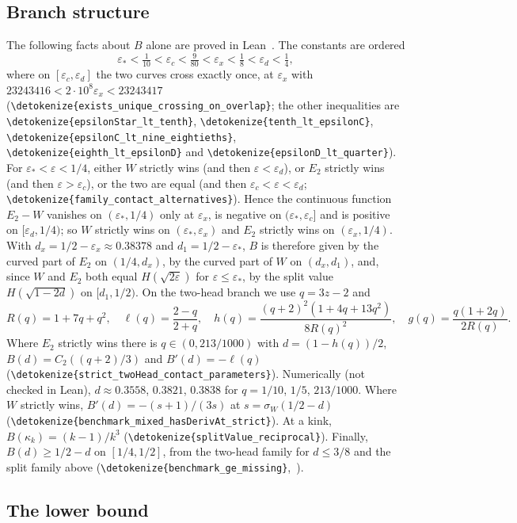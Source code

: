 \documentclass[10pt]{article}
\theoremstyle{definition}
\theoremstyle{remark}
\numberwithin{equation}{section}
\newcommand{\eps}{\varepsilon}
\newcommand{\leanid}[1]{\expandafter\nolinkurl\expandafter{\detokenize{#1}}}
\newcommand{\Fm}[1]{\cite[#1]{Formalization}}
\begin{document}
\subsection{Branch structure}\label{sec:branches}
The following facts about $B$ alone are proved in Lean~\Fm{\S2}. The constants are ordered
\[
 \eps_*<\tfrac1{10}<\eps_c<\tfrac9{80}<\eps_x<\tfrac18<\eps_d<\tfrac14,
\]
where on $[\eps_c,\eps_d]$ the two curves cross exactly once, at $\eps_x$ with $23243416<2\cdot10^8\eps_x<23243417$ (\leanid{exists_unique_crossing_on_overlap}; the other inequalities are \leanid{epsilonStar_lt_tenth}, \leanid{tenth_lt_epsilonC}, \leanid{epsilonC_lt_nine_eightieths}, \leanid{eighth_lt_epsilonD} and \leanid{epsilonD_lt_quarter}). For $\eps_*<\eps<1/4$, either $W$ strictly wins (and then $\eps<\eps_d$), or $E_2$ strictly wins (and then $\eps>\eps_c$), or the two are equal (and then $\eps_c<\eps<\eps_d$; \leanid{family_contact_alternatives}). Hence the continuous function $E_2-W$ vanishes on $(\eps_*,1/4)$ only at $\eps_x$, is negative on $(\eps_*,\eps_c]$ and is positive on $[\eps_d,1/4)$; so $W$ strictly wins on $(\eps_*,\eps_x)$ and $E_2$ strictly wins on $(\eps_x,1/4)$. With $d_x=1/2-\eps_x\approx0.38378$ and $d_1=1/2-\eps_*$, $B$ is therefore given by the curved part of $E_2$ on $(1/4,d_x)$, by the curved part of $W$ on $(d_x,d_1)$, and, since $W$ and $E_2$ both equal $H(\sqrt{2\eps})$ for $\eps\le\eps_*$, by the split value $H(\sqrt{1-2d})$ on $[d_1,1/2)$. On the two-head branch we use $q=3z-2$ and
\begin{equation}\label{eq:qparam}
 R(q)=1+7q+q^2,\quad \ell(q)=\frac{2-q}{2+q},\quad h(q)=\frac{(q+2)^2(1+4q+13q^2)}{8R(q)^2},\quad g(q)=\frac{q(1+2q)}{2R(q)} .
\end{equation}
Where $E_2$ strictly wins there is $q\in(0,213/1000)$ with $d=(1-h(q))/2$, $B(d)=C_2((q+2)/3)$ and $B'(d)=-\ell(q)$ (\leanid{strict_twoHead_contact_parameters}). Numerically (not checked in Lean), $d\approx0.3558$, $0.3821$, $0.3838$ for $q=1/10$, $1/5$, $213/1000$. Where $W$ strictly wins, $B'(d)=-(s+1)/(3s)$ at $s=\sigma_W(1/2-d)$ (\leanid{benchmark_mixed_hasDerivAt_strict}). At a kink, $B(\kappa_k)=(k-1)/k^3$ (\leanid{splitValue_reciprocal}). Finally, $B(d)\ge1/2-d$ on $[1/4,1/2]$, from the two-head family for $d\le3/8$ and the split family above (\leanid{benchmark_ge_missing},~\Fm{\S8.3}).

\subsection{The lower bound}
\end{document}
